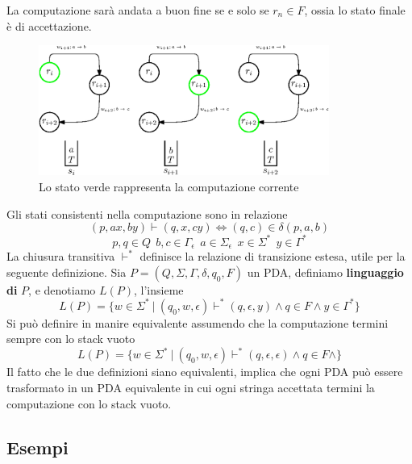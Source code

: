 \documentclass[10pt, letterpaper]{report}
\begin{document}
La computazione sarà andata a buon fine se e solo se $r_n\in F$, ossia lo stato finale è di accettazione.\begin{center}
    \begin{figure}[h!]
        \centering 
        \includegraphics[width=0.85\textwidth ]{images/pda1.eps}
        \caption{Lo stato verde rappresenta la computazione corrente}
        \label{fig:pdaComp}
    \end{figure}
\end{center}
Gli stati consistenti nella computazione sono in relazione 
$$ (p,ax,by)\vdash (q,x,cy)\iff (q,c)\in\delta(p,a,b)$$
$$ p,q\in Q\  \ b,c\in\Gamma_\epsilon\ \ a\in\Sigma_\epsilon\ \ x\in\Sigma^* \ \ y\in\Gamma^*$$
La chiusura transitiva $\vdash^*$ definisce la relazione di transizione estesa, utile per la seguente 
definizione.\acc 
{} Sia $P=(Q,\Sigma,\Gamma,\delta,q_0,F)$ un PDA, definiamo \textbf{linguaggio di }$P$, e denotiamo $L(P)$, 
l'insieme $$L(P)=\{w\in\Sigma^* \ | \ (q_0,w,\epsilon)\vdash^* (q,\epsilon,y) \land q\in F\land y\in\Gamma^*\} $$
Si può definire in manire equivalente assumendo che la computazione termini sempre 
con lo stack vuoto 
$$L(P)=\{w\in\Sigma^* \ | \ (q_0,w,\epsilon)\vdash^* (q,\epsilon,\epsilon) \land q\in F\land\} $$
Il fatto che le due definizioni siano equivalenti, implica che ogni PDA può essere trasformato in un PDA equivalente 
in cui ogni stringa accettata termini la computazione con lo stack vuoto.
\subsection{Esempi}
\end{document}
